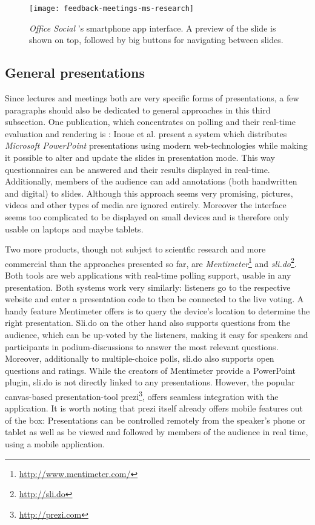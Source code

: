 \begin{figure}
\centering
\texttt{[image: feedback-meetings-ms-research]}
\caption{\emph{Office Social} \cite{Chattopadhyay:OfficeSocialRemoteControl}'s smartphone app interface. A preview of the slide is shown on top, followed by big buttons for navigating between slides.}
\label{fig:related-work-crowd-feedback}
\end{figure}

\subsection{General presentations}
Since lectures and meetings both are very specific forms of presentations, a few paragraphs should also be dedicated to general approaches in this third subsection.
One publication, which concentrates on polling and their real-time evaluation and rendering is \cite{Inoue:RealTimeQuestionnaire}: Inoue et al. present a system which distributes \emph{Microsoft PowerPoint} presentations using modern web-technologies while making it possible to alter and update the slides in presentation mode. This way questionnaires can be answered and their results displayed in real-time. Additionally, members of the audience can add annotations (both handwritten and digital) to slides. Although this approach seems very promising, pictures, videos and other types of media are ignored entirely. Moreover the interface seems too complicated to be displayed on small devices and is therefore only usable on laptops and maybe tablets.

Two more products, though not subject to scientfic research and more commercial than the approaches presented so far, are \emph{Mentimeter}\footnote{\url{http://www.mentimeter.com/}} and \emph{sli.do}\footnote{\url{http://sli.do}}. Both tools are web applications with real-time polling support, usable in any presentation. Both systems work very similarly: listeners go to the respective website and enter a presentation code to then be connected to the live voting. A handy feature Mentimeter offers is to query the device's location to determine the right presentation. Sli.do on the other hand also supports questions from the audience, which can be up-voted by the listeners, making it easy for speakers and participants in podium-discussions to answer the most relevant questions. Moreover, additionally to multiple-choice polls, sli.do also supports open questions and ratings. While the creators of Mentimeter provide a PowerPoint plugin, sli.do is not directly linked to any presentations. However, the popular canvas-based presentation-tool prezi\footnote{\url{http://prezi.com}}, offers seamless integration with the application. It is worth noting that prezi itself already offers mobile features out of the box: Presentations can be controlled remotely from the speaker's phone or tablet as well as be viewed and followed by members of the audience in real time, using a mobile application.

